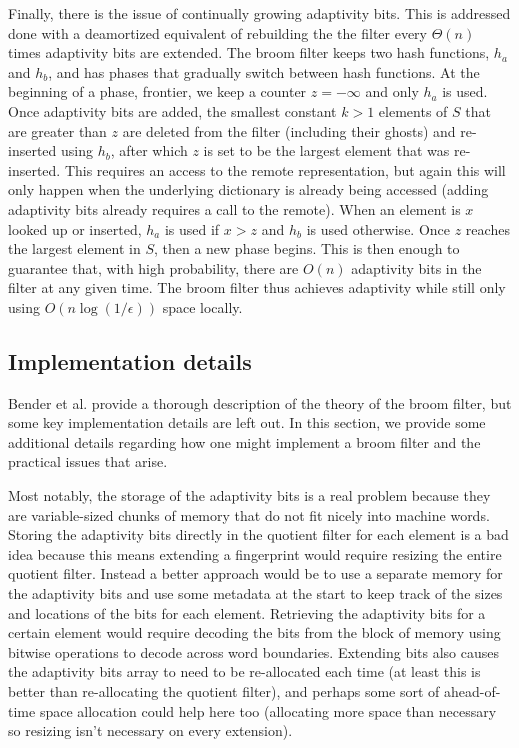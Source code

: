\documentclass[../paper.tex]{subfiles}
\begin{document}
Finally, there is the issue of continually growing adaptivity bits.
This is addressed done with a deamortized equivalent of rebuilding the the filter
every $\Theta (n)$ times adaptivity bits are extended. The broom filter keeps
two hash functions, $h_a$ and $h_b$, and has phases that
gradually switch between hash functions.  At the beginning of a phase,
frontier, we keep a counter $z = -\infty$ and only $h_a$ is used.  Once adaptivity bits are
added, the smallest constant $k > 1$ elements of $S$ that are greater than
$z$ are deleted from the filter (including their ghosts) and re-inserted
using $h_b$, after which $z$ is set to be the largest element that was
re-inserted.  This requires an access to the remote representation, but
again this will only happen when the underlying dictionary is already
being accessed (adding adaptivity bits already requires a call to the remote).
When an element is $x$ looked up or inserted, $h_a$ is
used if $x > z$ and $h_b$ is used otherwise.  Once $z$ reaches the largest
element in $S$, then a new phase begins.  This is then enough to guarantee
that, with high probability, there are $O(n)$ adaptivity bits in the
filter at any given time.  The broom filter thus achieves adaptivity while
still only using $O(n \log (1/\epsilon))$ space locally.  

\subsection{Implementation details}

Bender et al. \cite{broom-filter} provide a thorough description of the theory of
the broom filter, but some key implementation details are left out. In this section,
we provide some additional details regarding how one might implement a broom filter
and the practical issues that arise.

Most notably, the storage of the adaptivity bits is a real problem
because they are variable-sized chunks of memory that
do not fit nicely into machine words. Storing the adaptivity
bits directly in the quotient filter for each element is a bad idea
because this means extending a fingerprint would require resizing
the entire quotient filter. Instead a better approach would be
to use a separate memory for the adaptivity bits and use some metadata
at the start to keep track of the sizes and locations of the bits for each element. Retrieving
the adaptivity bits for a certain element would require decoding the bits
from the block of memory using bitwise operations to decode across word boundaries.
Extending bits also causes the adaptivity bits array to need to be re-allocated
each time (at least this is better than re-allocating the quotient filter), and
perhaps some sort of ahead-of-time space allocation could help here too (allocating more space than
necessary so resizing isn't necessary on every extension).
\end{document}

